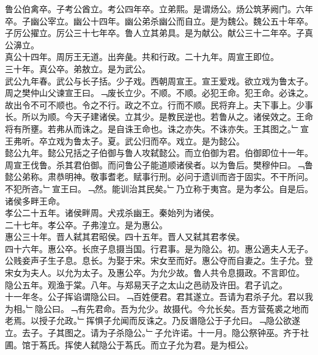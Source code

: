 \documentclass{zhvt-classic}
\begin{document}
\hspace*{2em}鲁公伯禽卒。子考公酋立。考公四年卒。立弟熙。是谓炀公。炀公筑茅阙门。六年卒。子幽公宰立。幽公十四年。幽公弟杀幽公而自立。是为魏公。魏公五十年卒。子厉公擢立。厉公三十七年卒。鲁人立其弟具。是为献公。献公三十二年卒。子真公濞立。\\
\hspace*{2em}真公十四年。周厉王无道。出奔彘。共和行政。二十九年。周宣王即位。\\
\hspace*{2em}三十年。真公卒。弟敖立。是为武公。\\
\hspace*{2em}武公九年春。武公与长子括。少子戏。西朝周宣王。宣王爱戏。欲立戏为鲁太子。周之樊仲山父谏宣王曰。﹁废长立少。不顺。不顺。必犯王命。犯王命。必诛之。故出令不可不顺也。令之不行。政之不立。行而不顺。民将弃上。夫下事上。少事长。所以为顺。今天子建诸侯。立其少。是教民逆也。若鲁从之。诸侯效之。王命将有所壅。若弗从而诛之。是自诛王命也。诛之亦失。不诛亦失。王其图之。﹂宣王弗听。卒立戏为鲁太子。夏。武公归而卒。戏立。是为懿公。\\
\hspace*{2em}懿公九年。懿公兄括之子伯御与鲁人攻弑懿公。而立伯御为君。伯御即位十一年。周宣王伐鲁。杀其君伯御。而问鲁公子能道顺诸侯者。以为鲁后。樊穆仲曰。﹁鲁懿公弟称。肃恭明神。敬事耆老。赋事行刑。必问于遗训而咨于固实。不干所问。不犯所咨。﹂宣王曰。﹁然。能训治其民矣。﹂乃立称于夷宫。是为孝公。自是后。诸侯多畔王命。\\
\hspace*{2em}孝公二十五年。诸侯畔周。犬戎杀幽王。秦始列为诸侯。\\
\hspace*{2em}二十七年。孝公卒。子弗湟立。是为惠公。\\
\hspace*{2em}惠公三十年。晋人弑其君昭侯。四十五年。晋人又弑其君孝侯。\\
\hspace*{2em}四十六年。惠公卒。长庶子息摄当国。行君事。是为隐公。初。惠公適夫人无子。公贱妾声子生子息。息长。为娶于宋。宋女至而好。惠公夺而自妻之。生子允。登宋女为夫人。以允为太子。及惠公卒。为允少故。鲁人共令息摄政。不言即位。\\
\hspace*{2em}隐公五年。观渔于棠。八年。与郑易天子之太山之邑祊及许田。君子讥之。\\
\hspace*{2em}十一年冬。公子挥谄谓隐公曰。﹁百姓便君。君其遂立。吾请为君杀子允。君以我为相。﹂隐公曰。﹁有先君命。吾为允少。故摄代。今允长矣。吾方营菟裘之地而老焉。以授子允政。﹂挥惧子允闻而反诛之。乃反谮隐公于子允曰。﹁隐公欲遂立。去子。子其图之。请为子杀隐公。﹂子允许诺。十一月。隐公祭钟巫。齐于社圃。馆于蒍氏。挥使人弑隐公于蒍氏。而立子允为君。是为桓公。\\
\end{document}
